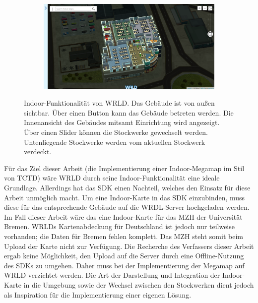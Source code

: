 \begin{figure}
\begin{subfigure}{0.49\textwidth}
        \caption{}
        \label{sfig:wrld_indoor_transition}
    \end{subfigure}
    \hfill
    \begin{subfigure}{0.49\textwidth}
        \includegraphics[width=\textwidth]{figures/wrdl_indoor_2.png}
        \caption{}
        \label{sfig:wrld_indoor_2}
    \end{subfigure}
    \caption{Indoor-Funktionalität von WRLD.\@ %
         Das Gebäude ist von außen sichtbar. %
        Über einen Button kann das Gebäude betreten werden. %
         Die Innenansicht des Gebäudes mitsamt Einrichtung wird angezeigt. %
         Über einen Slider können die Stockwerke gewechselt werden. %
         Untenliegende Stockwerke werden vom aktuellen Stockwerk verdeckt.%
    }
    \label{fig:wrld_indoor}
\end{figure}

Für das Ziel dieser Arbeit (die Implementierung einer Indoor-Megamap im Stil von TCTD) wäre WRLD durch seine Indoor-Funktionalität eine ideale Grundlage.
Allerdings hat das SDK einen Nachteil, welches den Einsatz für diese Arbeit unmöglich macht.
Um eine Indoor-Karte in das SDK einzubinden, muss diese für das entsprechende Gebäude auf die WRDL-Server hochgeladen werden.
Im Fall dieser Arbeit wäre das eine Indoor-Karte für das MZH der Universität Bremen.
WRLDs Kartenabdeckung für Deutschland ist jedoch nur teilweise vorhanden; die Daten für Bremen fehlen komplett.
Das MZH steht somit beim Upload der Karte nicht zur Verfügung.
Die Recherche des Verfassers dieser Arbeit ergab keine Möglichkeit, den Upload auf die Server durch eine Offline-Nutzung des SDKs zu umgehen.
Daher muss bei der Implementierung der Megamap auf WRLD verzichtet werden.
Die Art der Darstellung und Integration der Indoor-Karte in die Umgebung sowie der Wechsel zwischen den Stockwerken dient jedoch als Inspiration für die Implementierung einer eigenen Lösung.

